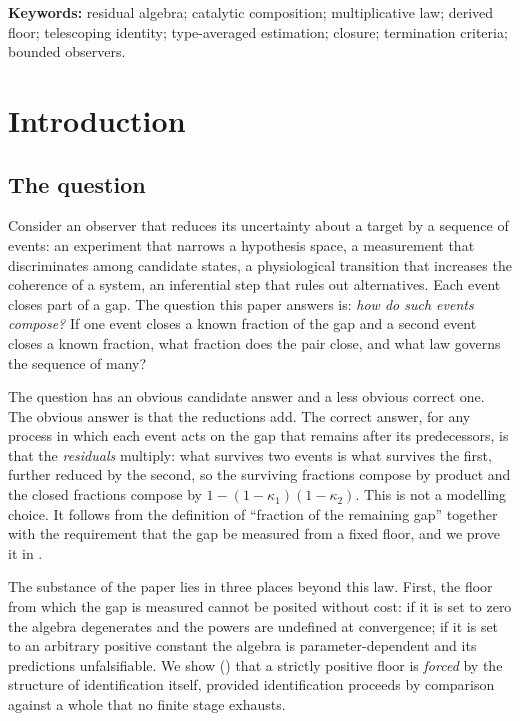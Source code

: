 \documentclass[11pt,a4paper]{article}
\theoremstyle{thmstyle}
\theoremstyle{definition}
\theoremstyle{remark}
\newcommand{\kap}{\kappa}
\begin{document}
\noindent\textbf{Keywords:} residual algebra; catalytic composition;
multiplicative law; derived floor; telescoping identity; type-averaged
estimation; closure; termination criteria; bounded observers.

\tableofcontents

\section{Introduction}
\label{sec:intro}

\subsection{The question}

Consider an observer that reduces its uncertainty about a target by a
sequence of events: an experiment that narrows a hypothesis space, a
measurement that discriminates among candidate states, a physiological
transition that increases the coherence of a system, an inferential step
that rules out alternatives. Each event closes part of a gap. The question
this paper answers is: \emph{how do such events compose?} If one event
closes a known fraction of the gap and a second event closes a known
fraction, what fraction does the pair close, and what law governs the
sequence of many?

The question has an obvious candidate answer and a less obvious correct
one. The obvious answer is that the reductions add. The correct answer, for
any process in which each event acts on the gap that remains after its
predecessors, is that the \emph{residuals} multiply: what survives two
events is what survives the first, further reduced by the second, so the
surviving fractions compose by product and the closed fractions compose by
$1-(1-\kap_1)(1-\kap_2)$. This is not a modelling choice. It follows from
the definition of ``fraction of the remaining gap'' together with the
requirement that the gap be measured from a fixed floor, and we prove it in
.

The substance of the paper lies in three places beyond this law. First, the
floor from which the gap is measured cannot be posited without cost: if it
is set to zero the algebra degenerates and the powers are undefined at
convergence; if it is set to an arbitrary positive constant the algebra is
parameter-dependent and its predictions unfalsifiable. We show
() that a strictly positive floor is \emph{forced} by the
structure of identification itself, provided identification proceeds by
comparison against a whole that no finite stage exhausts.
\end{document}
